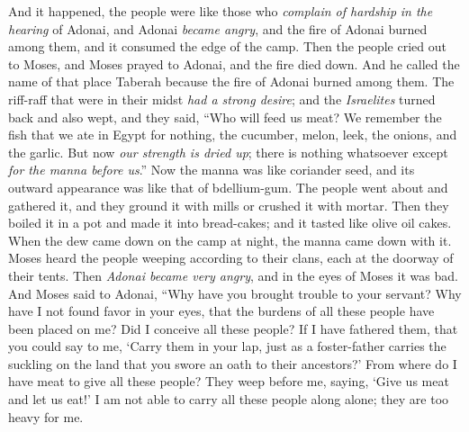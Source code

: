 \begin{biblechapter} %
 And it happened, the people were like those who \textit{complain of hardship} \textit{in the hearing} of Adonai, and Adonai \textit{became angry}, and the fire of Adonai burned among them, and it consumed the edge of the camp.
\verse Then the people cried out to Moses, and Moses prayed to Adonai, and the fire died down.
\verse And he called the name of that place Taberah because the fire of Adonai burned among them.
\verse The riff-raff that were in their midst \textit{had a strong desire}; and the \textit{Israelites} turned back and also wept, and they said, “Who will feed us meat?
\verse We remember the fish that we ate in Egypt for nothing, the cucumber, melon, leek, the onions, and the garlic.
\verse But now \textit{our strength is dried up}; there is nothing whatsoever except \textit{for the manna before us}.”
\verse Now the manna was like coriander seed, and its outward appearance was like that of bdellium-gum.
\verse The people went about and gathered it, and they ground it with mills or crushed it with mortar. Then they boiled it in a pot and made it into bread-cakes; and it tasted like olive oil cakes.
\verse When the dew came down on the camp at night, the manna came down with it.
\verse Moses heard the people weeping according to their clans, each at the doorway of their tents. Then \textit{Adonai became very angry}, and in the eyes of Moses it was bad.
\verse And Moses said to Adonai, “Why have you brought trouble to your servant? Why have I not found favor in your eyes, that the burdens of all these people have been placed on me?
\verse Did I conceive all these people? If I have fathered them, that you could say to me, ‘Carry them in your lap, just as a foster-father carries the suckling on the land that you swore an oath to their ancestors?’
\verse From where do I have meat to give all these people? They weep before me, saying, ‘Give us meat and let us eat!’
\verse I am not able to carry all these people along alone; they are too heavy for me.

\end{biblechapter}

